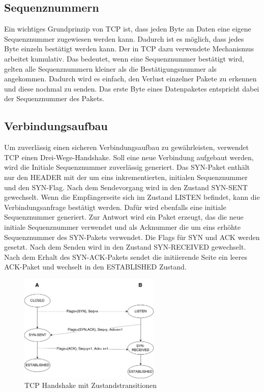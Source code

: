 \subsection{Sequenznummern}
Ein wichtiges Grundprinzip von TCP ist, dass jeden Byte an Daten eine eigene Sequenznummer zugewiesen werden kann. Dadurch ist es möglich, dass jedes Byte einzeln bestätigt werden kann. Der in TCP dazu verwendete Mechanismus arbeitet kumulativ. Das bedeutet, wenn eine Sequenznummer bestätigt wird, gelten alle Sequenznummern kleiner als die Bestätigungsnummer als angekommen. Dadurch wird es einfach, den Verlust einzelner Pakete zu erkennen und diese nochmal zu senden. Das erste Byte eines Datenpaketes entspricht dabei der Sequenznummer des Pakets. 

\subsection{Verbindungsaufbau}
Um zuverlässig einen sicheren Verbindungsaufbau zu gewährleisten, verwendet TCP einen Drei-Wege-Handshake. Soll eine neue Verbindung aufgebaut werden, wird die Initiale Sequenznummer zuverlässig generiert. Das SYN-Paket enthält nur den HEADER mit der um eins inkrementierten, initialen Sequenznummer und den SYN-Flag. Nach dem Sendevorgang wird in den Zustand SYN-SENT gewechselt. Wenn die Empfängerseite sich im Zustand LISTEN befindet, kann die Verbindungsanfrage bestätigt werden. Dafür wird ebenfalls eine initiale Sequenznummer generiert. Zur Antwort wird ein Paket erzeugt, das die neue initiale Sequenznummer verwendet und als Acknummer die um eins erhöhte Sequenznummer des SYN-Pakets verwendet. Die Flags für SYN und ACK werden gesetzt. Nach dem Senden wird in den Zustand SYN-RECEIVED gewechselt.\\
Nach dem Erhalt des SYN-ACK-Pakets sendet die initiierende Seite ein leeres ACK-Paket und wechselt in den ESTABLISHED Zustand. 

\begin{figure}[h]
	\centering
	\includegraphics[width=0.6\textwidth]{Graphics/tcp_Handshake.png}
	\caption{TCP Handshake mit Zustandstransitionen}
\end{figure}
\FloatBarrier
